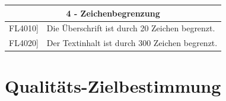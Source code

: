 \documentclass[a4paper]{scrreprt}
\begin{document}
    		\vspace{5mm}
    		
    		\begin{table}[h!]
    			\centering
    			\label{my-label}
    			\begin{tabular}{p{2cm}p{12cm}}
    				
    				\multicolumn{2}{c}{\textbf{4 - Zeichenbegrenzung}} \\ \hline
    				\centering{[}FL4010{]} & Die Überschrift ist durch 20 Zeichen begrenzt.\\
    				\centering{[}FL4020{]}& Der Textinhalt ist durch 300 Zeichen begrenzt.                              \\
    				\hline
    			\end{tabular}
    		\end{table}
    		
    		
    		\newpage
    		
    		\section{Qualitäts-Zielbestimmung}
    		
\end{document}

